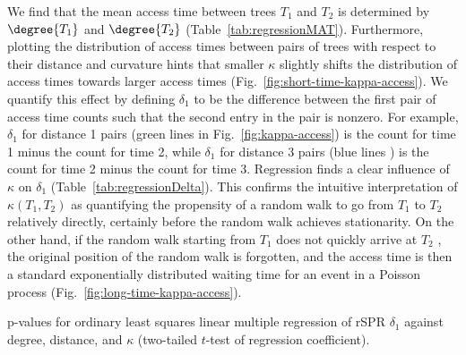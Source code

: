 \documentclass[10pt,twoside,leqno,twocolumn]{article}
\let\MYoriglatexcaption\caption
\renewcommand{\caption}[2][\relax]{\MYoriglatexcaption[#2]{#2}}
\newcommand{\cuttable}[2][]{%
    \ifthenelse{\equal{#1}{}}%
		{}%
		{#1}%
}
\begin{document}
We find that the mean access time between trees $T_1$ and $T_2$ is determined by $\degree{T_1}$ and $\degree{T_2}$ (Table~\ref{tab:regressionMAT}).
Furthermore, plotting the distribution of access times between pairs of trees with respect to their distance and curvature hints that smaller $\kappa$ slightly shifts the distribution of access times towards larger access times (Fig.~\ref{fig:short-time-kappa-access}).
We quantify this effect by defining $\delta_1$ to be the difference between the first pair of access time counts such that the second entry in the pair is nonzero.
For example, $\delta_1$ for distance 1 pairs (green lines in Fig.~\ref{fig:kappa-access}) is the count for time 1 minus the count for time 2, while $\delta_1$ for distance 3 pairs (blue lines\cuttable{ in Fig.~\ref{fig:kappa-access}}) is the count for time 2 minus the count for time 3.
Regression finds a clear influence of $\kappa$ on $\delta_1$ (Table~\ref{tab:regressionDelta}).
This confirms the intuitive interpretation of $\kappa(T_1, T_2)$ as quantifying the propensity of a random walk to go from $T_1$ to $T_2$ relatively directly, certainly before the random walk achieves stationarity.
On the other hand, if the random walk starting from $T_1$ does not quickly arrive at $T_2$\cuttable{ and instead achieves stationarity}, the original position of the random walk is forgotten, and the access time is then a standard exponentially distributed waiting time for an event in a Poisson process (Fig.~\ref{fig:long-time-kappa-access}).

\begin{table}
\centering
\caption{p-values for ordinary least squares linear multiple regression of rSPR $\delta_1$ against degree, distance, and $\kappa$ (two-tailed $t$-test of regression coefficient).}
\label{tab:regressionDelta}
\vspace{2em}
\end{table}
\end{document}
